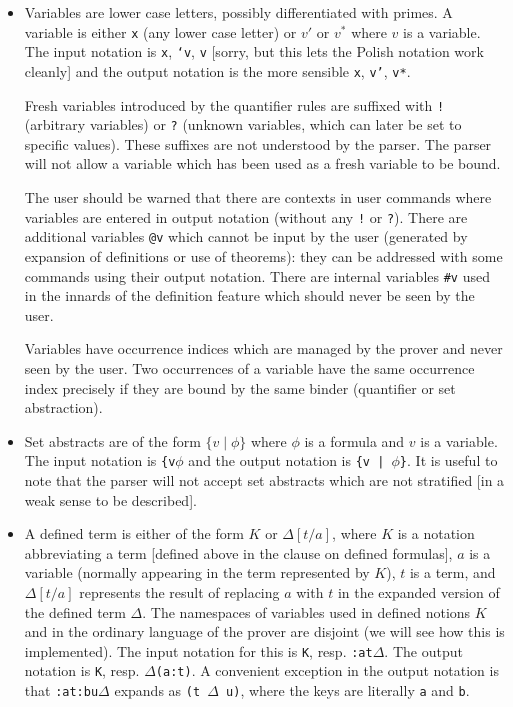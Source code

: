 \documentclass{article}
\begin{document}
\begin{itemize}

\item Variables are lower case letters, possibly differentiated with primes.  A variable is either {\tt x} (any lower case letter) or $v'$ or $v^*$ where $v$ is a variable.  The input notation is {\tt x}, {\tt `v}, {\tt *v} [sorry, but this lets the Polish notation work cleanly] and the output
notation is the more sensible {\tt x}, {\tt v'}, {\tt v*}.

Fresh variables introduced by the quantifier rules are suffixed with {\tt !} (arbitrary variables) or {\tt ?} (unknown variables, which can later be set to specific values).  These suffixes are not understood by the parser.  The parser will
not allow a variable which has been used as a fresh variable to be bound.

The user should be warned that there are contexts in user commands where variables are entered in output notation (without any {\tt !} or {\tt ?}).
There are additional variables {\tt @v} which cannot be input by the user (generated by expansion of definitions
or use of theorems):  they can be addressed with some commands using their output notation.  There are
internal variables {\tt \#v} used in the innards of the definition feature which should never be seen by the user.

Variables have occurrence indices which are managed by the prover and never seen by the user.  Two occurrences of a variable have the same occurrence index precisely if they are bound by the same binder (quantifier or set abstraction).

\item Set abstracts are of the form $\{v \mid \phi\}$ where $\phi$ is a formula and $v$ is a variable.  The input notation
is {\tt \{v$\phi$} and the output notation is {\tt \{v | $\phi$\}}.  It is useful to note that the parser will not accept
set abstracts which are not stratified [in a weak sense to be described].

\item  A defined term is either of the form $K$ or $\Delta[t/a]$, where $K$ is a notation abbreviating a term [defined above in the clause on defined formulas], $a$ is a variable (normally appearing in the term represented by $K$), $t$ is a term, and  $\Delta[t/a]$ represents the result of replacing $a$ with $t$ in the expanded version of the defined term $\Delta$.
The namespaces of variables used in defined notions $K$ and in the ordinary language of the prover are disjoint (we will see how this is implemented).  The input notation for this is {\tt K}, resp. {\tt :at$\Delta$}.  The output notation is
{\tt K}, resp. {\tt $\Delta$(a:t)}.  A convenient exception in the output notation is that {\tt :at:bu$\Delta$} expands
as {\tt (t $\Delta$ u)}, where the keys are literally {\tt a} and {\tt b}.


\end{itemize}
\end{document}
